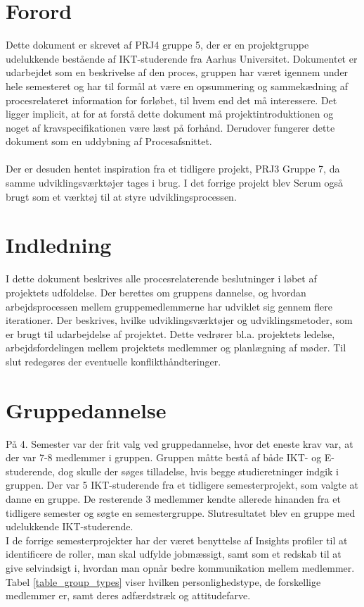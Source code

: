 \documentclass[a4paper,12pt,fleqn,oneside]{article}
\begin{document}

\newpage
\tableofcontents \newpage 

\section{Forord}
Dette dokument er skrevet af PRJ4 gruppe 5, der er en projektgruppe udelukkende bestående af IKT-studerende fra Aarhus Universitet. Dokumentet er udarbejdet som en beskrivelse af den proces, gruppen har været igennem under hele semesteret og har til formål at være en opsummering og sammekædning af procesrelateret information for forløbet, til hvem end det må interessere. Det ligger implicit, at for at forstå dette dokument må projektintroduktionen og noget af kravspecifikationen være læst på forhånd. Derudover fungerer dette dokument som en uddybning af Procesafsnittet. \\\\
Der er desuden hentet inspiration fra et tidligere projekt, PRJ3 Gruppe 7, da samme udviklingsværktøjer tages i brug. I det forrige projekt blev Scrum også brugt som et værktøj til at styre udviklingsprocessen. 

\section{Indledning}
I dette dokument beskrives alle procesrelaterende beslutninger i løbet af projektets udfoldelse.
Der berettes om gruppens dannelse, og hvordan arbejdsprocessen mellem gruppemedlemmerne har udviklet sig gennem flere iterationer. Der beskrives, hvilke udviklingsværktøjer og udviklingsmetoder, som er brugt til udarbejdelse af projektet. Dette vedrører bl.a. projektets ledelse, arbejdsfordelingen mellem projektets medlemmer og planlægning af møder. Til slut redegøres der eventuelle konflikthåndteringer. 

\section{Gruppedannelse}
På 4. Semester var der frit valg ved gruppedannelse, hvor det eneste krav var, at der var 7-8 medlemmer i gruppen. Gruppen måtte bestå af både IKT- og E-studerende, dog skulle der søges tilladelse, hvis begge studieretninger indgik i gruppen. Der var 5 IKT-studerende fra et tidligere semesterprojekt, som valgte at danne en gruppe. De resterende 3 medlemmer kendte allerede hinanden fra et tidligere semester og søgte en semestergruppe. Slutresultatet blev en gruppe med udelukkende IKT-studerende. \\
I de forrige semesterprojekter har der været benyttelse af Insights profiler til at identificere de roller, man skal udfylde jobmæssigt, samt som et redskab til at give selvindsigt i, hvordan man opnår bedre kommunikation mellem medlemmer. Tabel \ref{table_group_types} viser hvilken personlighedstype, de forskellige medlemmer er, samt deres adfærdstræk og attitudefarve. 
\end{document}
